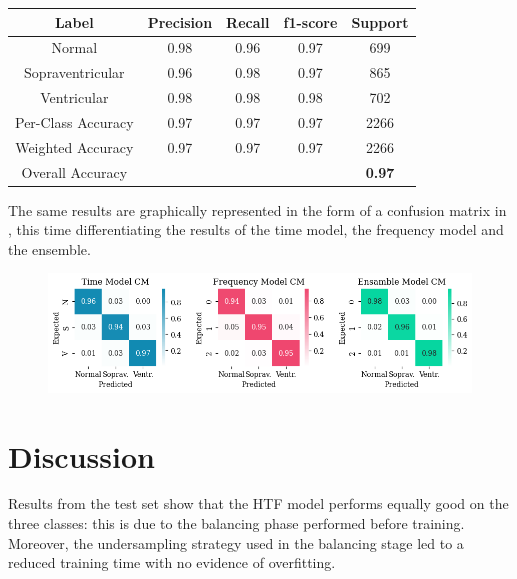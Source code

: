\documentclass[conference]{IEEEtran}
\begin{document}
    \begin{center}
        \begin{tabular}{||c|c c c c||}
            \hline
            Label & Precision & Recall & f1-score & Support\\
            \hline \hline
        
            Normal& 0.98&0.96&0.97&699\\
            \hline
            Sopraventricular& 0.96&0.98&0.97&865\\
            \hline
            Ventricular& 0.98&0.98&0.98&702\\
            \hline\hline
        
            Per-Class Accuracy &0.97&0.97&0.97&2266\\
            \hline
            Weighted Accuracy &0.97&0.97&0.97&2266\\
            \hline
            Overall Accuracy&&&&\textbf{0.97}\\
            \hline
        \end{tabular}
    \end{center}

    The same results are graphically represented in the form of a
    confusion matrix in , this time differentiating
    the results of the time model, the frequency model and the
    ensemble.

    \begin{figure}
        \centering
        \includegraphics[width=\linewidth]{img/confmatr.png}
        \caption{}
        \label{fig:confmat}
    \end{figure}

\section{Discussion}
    Results from the test set show that the HTF model performs equally good on
    the three classes: this is due to the balancing phase performed before
    training. Moreover, the undersampling strategy used in the balancing
    stage led to a reduced training time with no evidence of overfitting.
\end{document}
